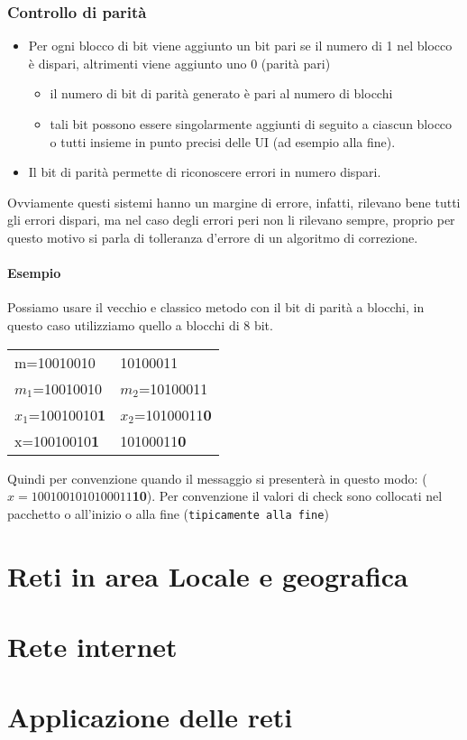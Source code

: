 \documentclass{book}
\begin{document}
\subsection{Controllo di parità}
\begin{itemize}
	\item Per ogni blocco di bit viene aggiunto un bit pari se il numero di 1
		nel blocco è dispari, altrimenti viene aggiunto uno 0 (parità pari)
		\begin{itemize}
			\item il numero di bit di parità generato è pari al numero di
				blocchi
			\item tali bit possono essere singolarmente aggiunti di seguito a
				ciascun blocco o tutti insieme in punto precisi delle UI (ad
				esempio alla fine).
		\end{itemize}
	\item Il bit di parità permette di riconoscere errori in numero dispari.
\end{itemize}
Ovviamente questi sistemi hanno un margine di errore, infatti, rilevano bene
tutti gli errori dispari, ma nel caso degli errori peri non li rilevano sempre,
proprio per questo motivo si parla di tolleranza d'errore di un algoritmo di
correzione.
\subsubsection{Esempio}
Possiamo usare il vecchio e classico metodo con il bit di parità a blocchi, in
questo caso utilizziamo quello a blocchi di 8 bit.
\begin{center}
	\begin{tabular}{ll}
		m=10010010&10100011\\
		$m_1$=10010010&$m_2$=10100011\\
		$x_1$=10010010{\bf\color{red}1}&$x_2$=10100011{\bf\color{red}0}\\
		x=10010010{\bf\color{red}1}&10100011{\bf\color{red}0}
	\end{tabular}
\end{center}
Quindi per convenzione quando il messaggio si presenterà in questo modo:
($x=1001001010100011${\bf\color{red}10}). Per convenzione il valori di check
sono collocati nel pacchetto o all'inizio o alla fine (\texttt{tipicamente alla
fine})
\chapter{Reti in area Locale e geografica}

\chapter{Rete internet}

\chapter{Applicazione delle reti}
\printindex
\end{document}
